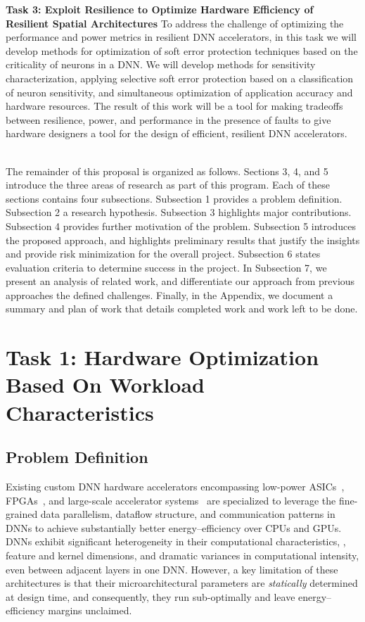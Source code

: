 \textbf{Task 3: Exploit Resilience to Optimize Hardware Efficiency of Resilient Spatial Architectures}
To address the challenge of optimizing the performance and power metrics in resilient DNN accelerators, in this task we will develop methods for optimization of soft error protection techniques based on the criticality of neurons in a DNN.
We will develop methods for sensitivity characterization, applying selective soft error protection based on a classification of neuron sensitivity, and simultaneous optimization of application accuracy and hardware resources.
The result of this work will be a tool for making tradeoffs between resilience, power, and performance in the presence of faults to give hardware designers a tool for the design of efficient, resilient DNN accelerators.

\noindent\\
The remainder of this proposal is organized as follows. 
Sections 3, 4, and 5 introduce the three areas of research as part of this program.
Each of these sections contains four subsections.
Subsection 1 provides a problem definition. 
Subsection 2 a research hypothesis.
Subsection 3 highlights major contributions.
Subsection 4 provides further motivation of the problem. 
Subsection 5 introduces the proposed approach, and highlights preliminary results that justify the insights and provide risk minimization for the overall project.
Subsection 6 states evaluation criteria to determine success in the project.
In Subsection 7, we present an analysis of related work, and differentiate our approach from previous approaches the defined challenges.
Finally, in the Appendix, we document a summary and plan of work that details completed work and work left to be done.

\section{Task 1: Hardware Optimization Based On Workload Characteristics} 

\subsection{Problem Definition}

Existing custom DNN hardware accelerators encompassing low-power ASICs~\cite{reagen2016minerva,chen2017eyeriss,du2015shidiannao}, FPGAs~\cite{chung2017accelerating}, and large-scale accelerator systems~\cite{venkataramani2017scaledeep, chen2014dadiannao,jouppi2017datacenter} are specialized to leverage the fine-grained data parallelism, dataflow structure, and communication patterns in DNNs to achieve substantially better energy--efficiency over CPUs and GPUs.
DNNs exhibit significant heterogeneity in their computational characteristics, \ie, feature and kernel dimensions, and dramatic variances in computational intensity, even between adjacent layers in one DNN.
However, a key limitation of these architectures is that their microarchitectural parameters are \emph{statically} determined at design time, and consequently, they run sub-optimally and leave energy--efficiency margins unclaimed.

